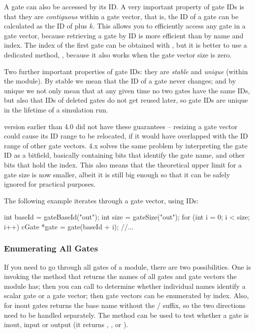 A gate can also be accessed by its ID. A very important property of gate IDs
is that they are \textit{contiguous} within a gate vector, that is,
the ID of a gate  can be calculated as the ID of  plus $k$.
This allows you to efficiently access any gate in a gate vector, because
retrieving a gate by ID is more efficient than by name and index.
The index of the first gate can be obtained with ,
but it is better to use a dedicated method, ,
because it also works when the gate vector size is zero.

Two further important properties of gate IDs: they are \textit{stable}
and \textit{unique} (within the module). By stable we mean that the ID
of a gate never changes; and by unique we not only mean that at any
given time no two gates have the same IDs, but also that IDs of deleted
gates do not get reused later, so gate IDs are unique in the lifetime
of a simulation run.

\begin{note}
    {\opp} version earlier than 4.0 did not have these guarantees -- resizing
    a gate vector could cause its ID range to be relocated, if it
    would have overlapped with the ID range of other gate vectors.
    {\opp} 4.x solves the same problem by interpreting the gate ID
    as a bitfield, basically containing bits that identify the gate name,
    and other bits that hold the index. This also means that the theoretical
    upper limit for a gate size is now smaller, albeit it is still
    big enough so that it can be safely ignored for practical purposes.
\end{note}

The following example iterates through a gate vector, using IDs:

\begin{cpp}
int baseId = gateBaseId("out");
int size = gateSize("out");
for (int i = 0; i < size; i++) {
    cGate *gate = gate(baseId + i);
    //...
}
\end{cpp}


\subsubsection{Enumerating All Gates}
\label{sec:simple-modules:enumerating-gates}

If you need to go through all gates of a module, there are
two possibilities. One is invoking the  method
that returns the names of all gates and gate vectors the module
has; then you can call  to determine
whether individual names identify a scalar gate or a gate vector;
then gate vectors can be enumerated by index. Also, for inout
gates  returns the base name without the
/ suffix, so the two directions
need to be handled separately. The  method
can be used to test whether a gate is inout, input or output
(it returns , , or
).

